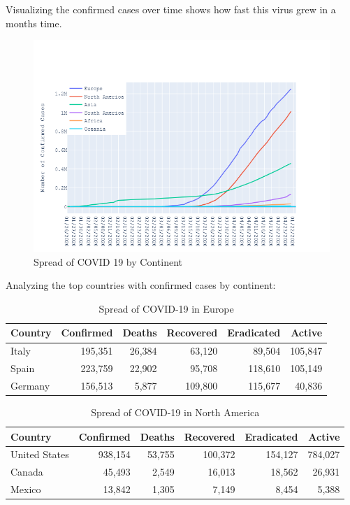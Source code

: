 \documentclass{homework}
\begin{document}
Visualizing the confirmed cases over time shows how fast this virus grew in a months time.

\begin{figure}[h]
  \centering
  \includegraphics[scale=0.6]{continent}
  \caption{Spread of COVID 19 by Continent}
\end{figure}

\newpage

Analyzing the top countries with confirmed cases by continent:

\begin{table}[H]
  \caption{Spread of COVID-19 in Europe}
  \label{Europe Spread}
  \centering
  \begin{tabular}{lrrrrr}
    \toprule
    Country & Confirmed & Deaths & Recovered & Eradicated & Active \\
    \midrule
    Italy   & 195,351    & 26,384  & 63,120     & 89,504      & 105,847 \\
    Spain   & 223,759    & 22,902  & 95,708     & 118,610     & 105,149 \\
    Germany & 156,513    & 5,877   & 109,800    & 115,677     & 40,836  \\
    \bottomrule
  \end{tabular}
\end{table}

\vspace{-1.5em}

\begin{table}[H]
  \caption{Spread of COVID-19 in North America}
  \label{North America Spread}
  \centering
  \begin{tabular}{lrrrrr}
    \toprule
    Country       & Confirmed & Deaths & Recovered & Eradicated & Active \\
    \midrule
    United States & 938,154    & 53,755  & 100,372    & 154,127     & 784,027 \\
    Canada        & 45,493     & 2,549   & 16,013     & 18,562      & 26,931  \\
    Mexico        & 13,842     & 1,305   & 7,149      & 8,454       & 5,388   \\
    \bottomrule
  \end{tabular}
\end{table}
\end{document}
